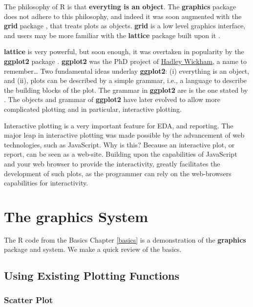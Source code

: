 \documentclass[]{book}
\theoremstyle{definition}
\theoremstyle{definition}
\theoremstyle{definition}
\theoremstyle{remark}
\begin{document}
The philosophy of R is that \textbf{everyting is an object}. The
\textbf{graphics} package does not adhere to this philosophy, and indeed
it was soon augmented with the \textbf{grid} package \citep{Rlanguage},
that treats plots as objects. \textbf{grid} is a low level graphics
interface, and users may be more familiar with the \textbf{lattice}
package built upon it \citep{lattice}.

\textbf{lattice} is very powerful, but soon enough, it was overtaken in
popularity by the \textbf{ggplot2} package \citep{ggplot2}.
\textbf{ggplot2} was the PhD project of \href{http://hadley.nz/}{Hadley
Wickham}, a name to remember\ldots{} Two fundamental ideas underlay
\textbf{ggplot2}: (i) everything is an object, and (ii), plots can be
described by a simple grammar, i.e., a language to describe the building
blocks of the plot. The grammar in \textbf{ggplot2} are is the one
stated by \citet{wilkinson2006grammar}. The objects and grammar of
\textbf{ggplot2} have later evolved to allow more complicated plotting
and in particular, interactive plotting.

Interactive plotting is a very important feature for EDA, and reporting.
The major leap in interactive plotting was made possible by the
advancement of web technologies, such as JavaScript. Why is this?
Because an interactive plot, or report, can be seen as a web-site.
Building upon the capabilities of JavaScript and your web browser to
provide the interactivity, greatly facilitates the development of such
plots, as the programmer can rely on the web-browsers capabilities for
interactivity.

\section{The graphics System}\label{the-graphics-system}

The R code from the Basics Chapter \ref{basics} is a demonstration of
the \textbf{graphics} package and system. We make a quick review of the
basics.

\subsection{Using Existing Plotting
Functions}\label{using-existing-plotting-functions}

\subsubsection{Scatter Plot}\label{scatter-plot}
\end{document}
